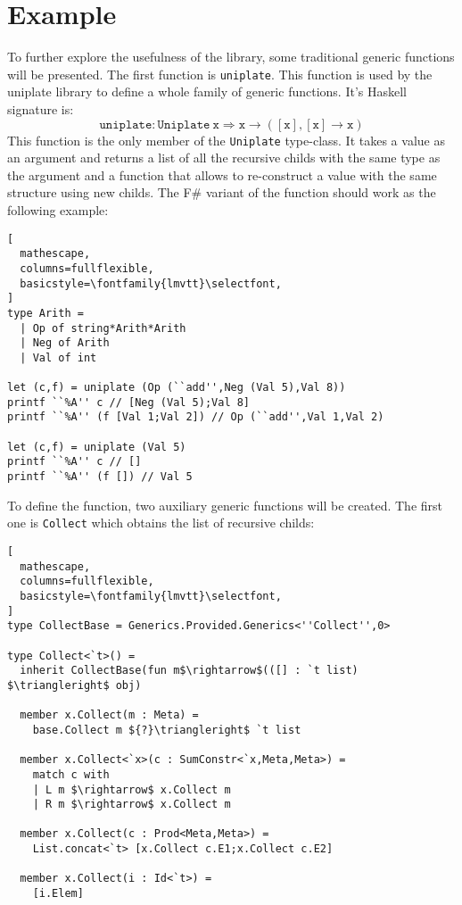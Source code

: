 \documentclass{sigplanconf}
\begin{document}
\section{Example}
To further explore the usefulness of the library, some
traditional generic functions will be presented. The
first function is \verb+uniplate+. This function is used
by the uniplate library \cite{uniplate} to define
a whole family of generic functions. It's Haskell
signature is: 
\[
\mathtt{uniplate}:\mathtt{Uniplate\ x}
\Rightarrow \mathtt{x} \rightarrow ([\mathtt{x}],[\mathtt{x}]\rightarrow \mathtt{x})
\]
This function is the only member of the \verb+Uniplate+
type-class. It takes a value as an argument and returns
a list of all the recursive childs with the same type
as the argument and a function that allows to re-construct
a value with the same structure using new childs. The
F\# variant of the function should work as the following
example:
\begin{lstlisting}[
  mathescape,
  columns=fullflexible,
  basicstyle=\fontfamily{lmvtt}\selectfont,
]
type Arith =
  | Op of string*Arith*Arith
  | Neg of Arith
  | Val of int
  
let (c,f) = uniplate (Op (``add'',Neg (Val 5),Val 8))
printf ``%A'' c // [Neg (Val 5);Val 8]
printf ``%A'' (f [Val 1;Val 2]) // Op (``add'',Val 1,Val 2)

let (c,f) = uniplate (Val 5)
printf ``%A'' c // []
printf ``%A'' (f []) // Val 5

\end{lstlisting}
To define the function, two auxiliary generic functions will be
created. The first one is \verb+Collect+ which obtains the list
of recursive childs:
\begin{lstlisting}[
  mathescape,
  columns=fullflexible,
  basicstyle=\fontfamily{lmvtt}\selectfont,
]
type CollectBase = Generics.Provided.Generics<''Collect'',0>

type Collect<`t>() =
  inherit CollectBase(fun m$\rightarrow$(([] : `t list) $\triangleright$ obj)

  member x.Collect(m : Meta) =
    base.Collect m ${?}\triangleright$ `t list

  member x.Collect<`x>(c : SumConstr<`x,Meta,Meta>) =
    match c with
    | L m $\rightarrow$ x.Collect m
    | R m $\rightarrow$ x.Collect m

  member x.Collect(c : Prod<Meta,Meta>) =
    List.concat<`t> [x.Collect c.E1;x.Collect c.E2]

  member x.Collect(i : Id<`t>) =
    [i.Elem]
\end{lstlisting}
\end{document}
